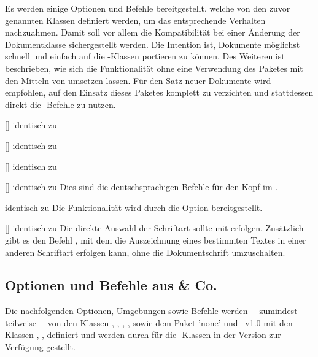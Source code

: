 \begin{Bundle*}{}
Es werden einige Optionen und Befehle bereitgestellt, welche von den zuvor 
genannten Klassen definiert werden, um das entsprechende Verhalten nachzuahmen. 
Damit soll vor allem die Kompatibilität bei einer Änderung der Dokumentklasse 
sichergestellt werden. Die Intention ist, Dokumente möglichst schnell und 
einfach auf die \TUDScript-Klassen portieren zu können. Des Weiteren ist 
beschrieben, wie sich die Funktionalität ohne eine Verwendung des Paketes 
 mit den Mitteln von \TUDScript umsetzen lassen. Für den 
Satz neuer Dokumente wird empfohlen, auf den Einsatz dieses Paketes komplett zu 
verzichten und stattdessen direkt die \TUDScript-Befehle zu nutzen.

\begin{Declaration}{[]}{%
  identisch zu %
}
\begin{Declaration}{[]}{%
  identisch zu %
}
\begin{Declaration}{[]}{%
  identisch zu %
}
\begin{Declaration}{[]}{%
  identisch zu %
}
\printdeclarationlist%
%
Dies sind die deutschsprachigen Befehle für den Kopf im \CD.
\end{Declaration}
\end{Declaration}
\end{Declaration}
\end{Declaration}

\begin{Declaration}{}{%
  identisch zu %
}
\printdeclarationlist%
%
Die Funktionalität wird durch die Option  bereitgestellt.
\end{Declaration}

\begin{Declaration}{[]}{%
  identisch zu %
}
\printdeclarationlist%
%
Die direkte Auswahl der Schriftart sollte mit  erfolgen. 
Zusätzlich gibt es den Befehl , mit dem die Auszeichnung 
eines bestimmten Textes in einer anderen Schriftart erfolgen kann, ohne die 
Dokumentschrift umzuschalten.
\end{Declaration}
%


\subsection{Optionen und Befehle aus  \& Co.}
%
Die nachfolgenden Optionen, Umgebungen sowie Befehle werden~-- zumindest 
teilweise~-- von den Klassen , , 
, ,  sowie dem Paket 
'none' und \TUDScript~v1.0 mit den Klassen 
, ,  
definiert und werden durch  für die \TUDScript-Klassen in 
der Version \vTUDScript{} zur Verfügung gestellt.


\end{Bundle*}
